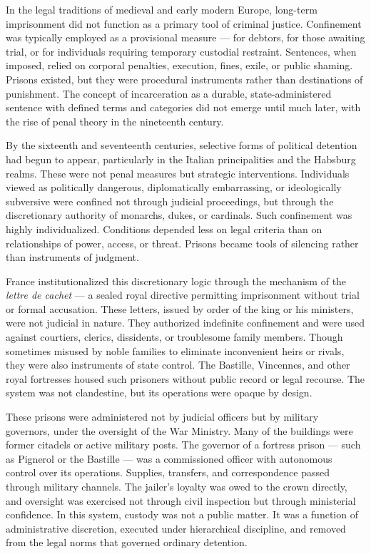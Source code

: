 In the legal traditions of medieval and early modern Europe, long-term imprisonment did not function as a primary tool of criminal justice. Confinement was typically employed as a provisional measure — for debtors, for those awaiting trial, or for individuals requiring temporary custodial restraint. Sentences, when imposed, relied on corporal penalties, execution, fines, exile, or public shaming. Prisons existed, but they were procedural instruments rather than destinations of punishment. The concept of incarceration as a durable, state-administered sentence with defined terms and categories did not emerge until much later, with the rise of penal theory in the nineteenth century.

By the sixteenth and seventeenth centuries, selective forms of political detention had begun to appear, particularly in the Italian principalities and the Habsburg realms. These were not penal measures but strategic interventions. Individuals viewed as politically dangerous, diplomatically embarrassing, or ideologically subversive were confined not through judicial proceedings, but through the discretionary authority of monarchs, dukes, or cardinals. Such confinement was highly individualized. Conditions depended less on legal criteria than on relationships of power, access, or threat. Prisons became tools of silencing rather than instruments of judgment.

France institutionalized this discretionary logic through the mechanism of the \textit{lettre de cachet } — a sealed royal directive permitting imprisonment without trial or formal accusation. These letters, issued by order of the king or his ministers, were not judicial in nature. They authorized indefinite confinement and were used against courtiers, clerics, dissidents, or troublesome family members. Though sometimes misused by noble families to eliminate inconvenient heirs or rivals, they were also instruments of state control. The Bastille, Vincennes, and other royal fortresses housed such prisoners without public record or legal recourse. The system was not clandestine, but its operations were opaque by design.

These prisons were administered not by judicial officers but by military governors, under the oversight of the War Ministry. Many of the buildings were former citadels or active military posts. The governor of a fortress prison — such as Pignerol or the Bastille — was a commissioned officer with autonomous control over its operations. Supplies, transfers, and correspondence passed through military channels. The jailer’s loyalty was owed to the crown directly, and oversight was exercised not through civil inspection but through ministerial confidence. In this system, custody was not a public matter. It was a function of administrative discretion, executed under hierarchical discipline, and removed from the legal norms that governed ordinary detention.

